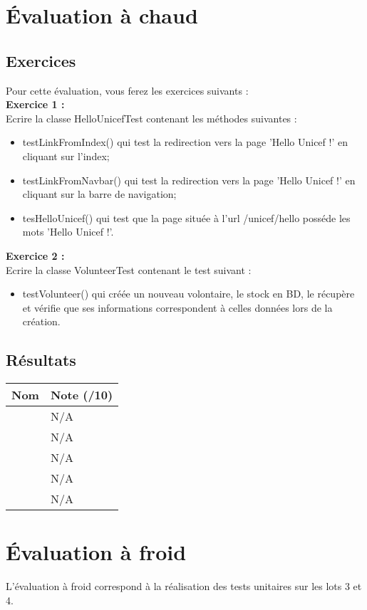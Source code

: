 \documentclass[asi, sansVersion]{picInsa}
\begin{document}
	\newpage
	\section*{Évaluation à chaud}
		\subsection*{Exercices}
		Pour cette évaluation, vous ferez les exercices suivants : 
		\\
		
		\textbf{Exercice 1 :}\\
		Ecrire la classe HelloUnicefTest contenant les méthodes suivantes :
		\begin{itemize}
			\item testLinkFromIndex() qui test la redirection vers la page 'Hello Unicef !' en cliquant sur l'index;
			\item testLinkFromNavbar() qui test la redirection vers la page 'Hello Unicef !' en cliquant sur la barre de navigation;
			\item tesHelloUnicef() qui test que la page située à l'url /unicef/hello posséde les mots 'Hello Unicef !'.
		\end{itemize}
		
		\textbf{Exercice 2 :}\\
		Ecrire la classe VolunteerTest contenant le test suivant : 
		\begin{itemize}
			\item testVolunteer() qui créée un nouveau volontaire, le stock en BD, le récupère et vérifie que ses informations correspondent à celles données lors de la création.
		\end{itemize}
		
			\vspace{8px}
			
		\subsection*{Résultats}
			\begin{longtable}{|p{0.5\textwidth}|p{}|}
				\hline
					\rowcolor[gray]{0.90} Nom & Note (/10) \\
				
				\hline
					\Mathieu & N/A \\
				\hline
					\Matthieu & N/A \\
				\hline
					\Kafui & N/A \\
				\hline
					\Melissa & N/A \\
				\hline
					\Florian & N/A \\
				\hline
			
			\end{longtable}
			
	\newpage
	\section*{Évaluation à froid}
		L'évaluation à froid correspond à la réalisation des tests unitaires sur les lots 3 et 4.
\end{document}
